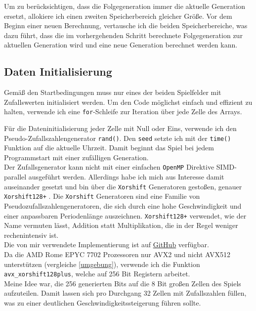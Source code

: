 \documentclass[german,plainarticle,hyperref,utf8]{zihpub}
\begin{document}
	Um zu berücksichtigen, dass die Folgegeneration immer die aktuelle Generation ersetzt, allokiere ich einen zweiten Speicherbereich gleicher Größe. Vor dem Beginn einer neuen Berechnung, vertausche ich die beiden Speicherbereiche, was dazu führt, dass die im vorhergehenden Schritt berechnete Folgegeneration zur aktuellen Generation wird und eine neue Generation berechnet werden kann.
	
	\subsection{Daten Initialisierung} \label{data_init}
	Gemäß den Startbedingungen muss nur eines der beiden Spielfelder mit Zufallswerten initialisiert werden.
	Um den Code möglichst einfach und effizient zu halten, verwende ich eine \texttt{for}-Schleife zur Iteration über jede Zelle des Arrays.
	
	Für die Dateninitialisierung jeder Zelle mit Null oder Eins, verwende ich den Pseudo-Zufallszahlengenerator \texttt{rand()}. Den \texttt{seed} setzte ich mit der \texttt{time()} Funktion auf die aktuelle Uhrzeit. Damit beginnt das Spiel bei jedem Programmstart mit einer zufälligen Generation.\\

	Der Zufallsgenerator kann nicht mit einer einfachen \texttt{OpenMP} Direktive SIMD-parallel ausgeführt werden. Allerdings habe ich mich aus Interesse damit auseinander gesetzt und bin über die \texttt{Xorshift} Generatoren gestoßen, genauer \texttt{Xorshift128+} \cite{xor}. Die \texttt{Xorshift} Generatoren sind eine Familie von Pseudozufallszahlengeneratoren, die sich durch eine hohe Geschwindigkeit und einer anpassbaren Periodenlänge auszeichnen.
	\texttt{Xorshift128+} verwendet, wie der Name vermuten lässt, Addition statt Multiplikation, die in der Regel weniger rechenintensiv ist.\\
	Die von mir verwendete Implementierung ist auf \href{https://github.com/lemire/SIMDxorshift}{GitHub} verfügbar.\\
	
	Da die AMD Rome EPYC 7702 Prozessoren nur AVX2 und nicht AVX512 unterstützen (vergleiche \ref{umgebung}), verwende ich die Funktion \texttt{avx\_xorshift128plus}, welche auf 256 Bit Registern arbeitet.\\
	Meine Idee war, die 256 generierten Bits auf die 8 Bit großen Zellen des Spiels aufzuteilen. Damit lassen sich pro Durchgang 32 Zellen mit Zufallszahlen füllen, was zu einer deutlichen Geschwindigkeitssteigerung führen sollte.
	
\end{document}
